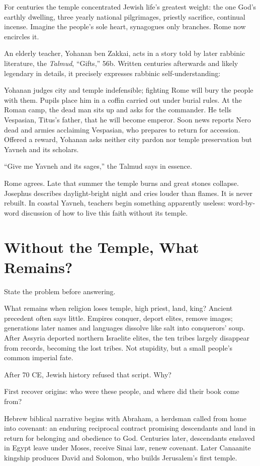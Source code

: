 For centuries the temple concentrated Jewish life's greatest weight: the one God's earthly dwelling, three yearly national pilgrimages, priestly sacrifice, continual incense. Imagine the people's sole heart, synagogues only branches. Rome now encircles it.

An elderly teacher, Yohanan ben Zakkai, acts in a story told by later rabbinic literature, the \textit{Talmud}, ``Gifts,'' 56b. Written centuries afterwards and likely legendary in details, it precisely expresses rabbinic self-understanding:

Yohanan judges city and temple indefensible; fighting Rome will bury the people with them. Pupils place him in a coffin carried out under burial rules. At the Roman camp, the dead man sits up and asks for the commander. He tells Vespasian, Titus's father, that he will become emperor. Soon news reports Nero dead and armies acclaiming Vespasian, who prepares to return for accession. Offered a reward, Yohanan asks neither city pardon nor temple preservation but Yavneh and its scholars.

``Give me Yavneh and its sages,'' the Talmud says in essence.

Rome agrees. Late that summer the temple burns and great stones collapse. Josephus describes daylight-bright night and cries louder than flames. It is never rebuilt. In coastal Yavneh, teachers begin something apparently useless: word-by-word discussion of how to live this faith without its temple.

\section{Without the Temple, What Remains?}
State the problem before answering.

What remains when religion loses temple, high priest, land, king? Ancient precedent often says little. Empires conquer, deport elites, remove images; generations later names and languages dissolve like salt into conquerors' soup. After Assyria deported northern Israelite elites, the ten tribes largely disappear from records, becoming the lost tribes. Not stupidity, but a small people's common imperial fate.

After 70 CE, Jewish history refused that script. Why?

First recover origins: who were these people, and where did their book come from?

Hebrew biblical narrative begins with Abraham, a herdsman called from home into covenant: an enduring reciprocal contract promising descendants and land in return for belonging and obedience to God. Centuries later, descendants enslaved in Egypt leave under Moses, receive Sinai law, renew covenant. Later Canaanite kingship produces David and Solomon, who builds Jerusalem's first temple.

